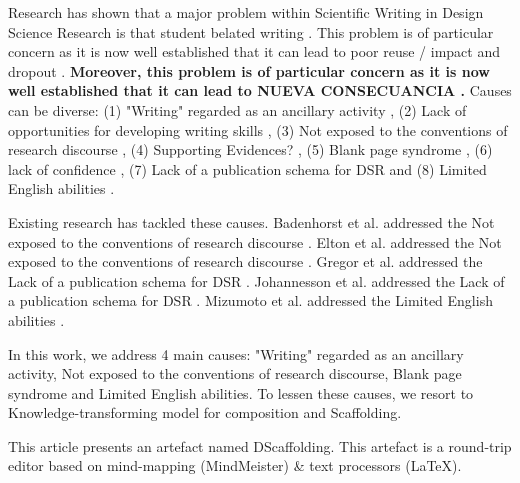 \documentclass{article}
\begin{document}
Research has shown that a major problem within Scientific Writing in Design Science Research is that student belated writing \cite{Wellington2010} \cite{Badley2009} \cite{Turbek2016}. This problem is of particular concern as it is now well established that it can lead to poor reuse / impact and dropout \cite{Wellington2010} \cite{Itua2014}.\textbf{ Moreover, this problem is of particular concern as it is now well established that it can lead to NUEVA CONSECUANCIA \cite{Itua2014}. } Causes can be diverse: (1) "Writing" regarded as an ancillary activity \cite{Turbek2016} \cite{Turbek2016}, (2) Lack of opportunities for developing writing skills \cite{Cotterall2011}, (3) Not exposed to the conventions of research discourse \cite{Elton2010} \cite{Badenhorst2015} \cite{Wellington2010} \cite{Cotterall2011} \cite{Itua2014}, (4) Supporting Evidences? \cite{Hsu2004} \cite{Badenhorst2015} \cite{Badenhorst2015} \cite{Cotterall2011} \cite{Itua2014} \cite{Cameron2009} \cite{Lindsay1854}, (5) Blank page syndrome \cite{Lindsay1854} \cite{Sorensen1994} \cite{Wellington2010} \cite{Cameron2009}, (6) lack of confidence \cite{Carter2012}, (7) Lack of a publication schema for DSR \cite{Gregor2013} \cite{Gregor2013} and (8) Limited English abilities \cite{Mizumoto2017} \cite{Cotterall2011} \cite{Anthony2003}. 
    
Existing research has tackled these causes. Badenhorst et al. addressed the Not exposed to the conventions of research discourse \cite{Badenhorst2015}. Elton et al. addressed the Not exposed to the conventions of research discourse \cite{Elton2010}. Gregor et al. addressed the Lack of a publication schema for DSR \cite{Gregor2013}. Johannesson et al. addressed the Lack of a publication schema for DSR \cite{JohannessonAnIntroduction}. Mizumoto et al. addressed the Limited English abilities \cite{Mizumoto2017}. 
    
In this work, we address 4 main causes: "Writing" regarded as an ancillary activity, Not exposed to the conventions of research discourse, Blank page syndrome and Limited English abilities. To lessen these causes, we resort to Knowledge-transforming model for composition and Scaffolding. 
    
This article presents an artefact named DScaffolding. This artefact is a round-trip editor based on mind-mapping (MindMeister) & text processors (LaTeX). 
    
\end{document}
